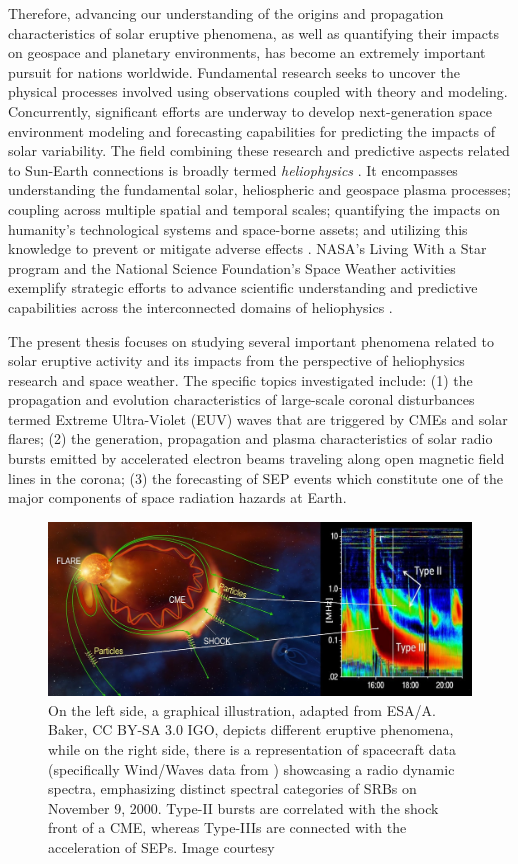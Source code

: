 Therefore, advancing our understanding of the origins and propagation characteristics of solar eruptive phenomena, as well as quantifying their impacts on geospace and planetary environments, has become an extremely important pursuit for nations worldwide. Fundamental research seeks to uncover the physical processes involved using observations coupled with theory and modeling. Concurrently, significant efforts are underway to develop next-generation space environment modeling and forecasting capabilities for predicting the impacts of solar variability. The field combining these research and predictive aspects related to Sun-Earth connections is broadly termed \textit{heliophysics} \citep{schrijver_siscoe_2010}. It encompasses understanding the fundamental solar, heliospheric and geospace plasma processes; coupling across multiple spatial and temporal scales; quantifying the impacts on humanity's technological systems and space-borne assets; and utilizing this knowledge to prevent or mitigate adverse effects \citep{schrijver_2015a, schrijver_2015b}. NASA's Living With a Star program and the National Science Foundation's Space Weather activities exemplify strategic efforts to advance scientific understanding and predictive capabilities across the interconnected domains of heliophysics \citep{brewer_2002}.

The present thesis focuses on studying several important phenomena related to solar eruptive activity and its impacts from the perspective of heliophysics research and space weather. The specific topics investigated include: (1) the propagation and evolution characteristics of large-scale coronal disturbances termed Extreme Ultra-Violet (EUV) waves that are triggered by CMEs and solar flares; (2) the generation, propagation and plasma characteristics of solar radio bursts emitted by accelerated electron beams traveling along open magnetic field lines in the corona; (3) the forecasting of SEP events which constitute one of the major components of space radiation hazards at Earth.

\begin{figure}[!htp]
	\centerline{\includegraphics[width=0.9\columnwidth]{chapter1/figs/srbs.jpeg}}
	\caption{On the left side, a graphical illustration, adapted from ESA/A. Baker, CC BY-SA 3.0 IGO, depicts different eruptive phenomena, while on the right side, there is a representation of spacecraft data (specifically Wind/Waves data from \citet{gopalswamy_2019}) showcasing a radio dynamic spectra, emphasizing distinct spectral categories of SRBs on November 9, 2000. Type-II bursts are correlated with the shock front of a CME, whereas Type-IIIs are connected with the acceleration of SEPs. Image courtesy\protect\footnotemark}
	\label{fig_sw}
\end{figure}

